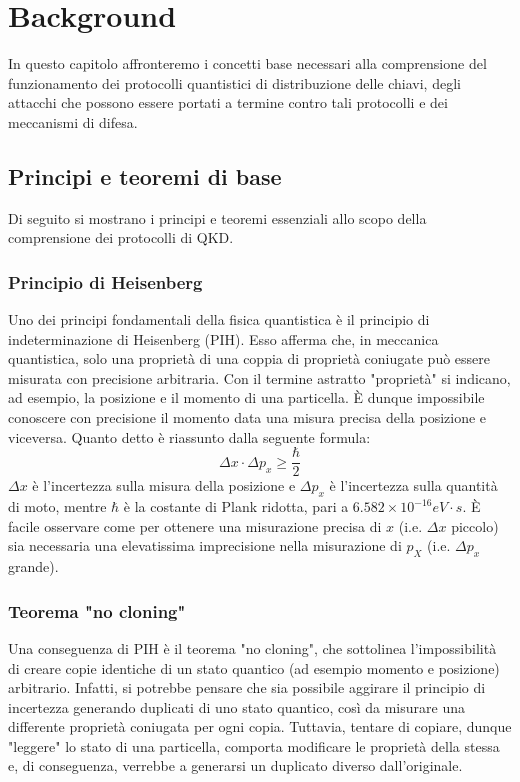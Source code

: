 \chapter{Background}
\label{chap:background}

In questo capitolo affronteremo i concetti base necessari alla comprensione del funzionamento dei protocolli quantistici di distribuzione delle chiavi, degli attacchi che possono essere portati a termine contro tali protocolli e dei meccanismi di difesa.

\section{Principi e teoremi di base}
\label{sec:principi_teoremi}
Di seguito si mostrano i principi e teoremi essenziali allo scopo della comprensione dei protocolli di QKD.

\subsection{Principio di Heisenberg}
Uno dei principi fondamentali della fisica quantistica è il principio di indeterminazione di Heisenberg (PIH). Esso afferma che, in meccanica quantistica, solo una proprietà di una coppia di proprietà coniugate può essere misurata con precisione arbitraria. Con il termine astratto "proprietà" si indicano, ad esempio, la posizione e il momento di una particella. È dunque impossibile conoscere con precisione il momento data una misura precisa della posizione e viceversa. Quanto detto è riassunto dalla seguente formula:
$$ \Delta x \cdot \Delta p_x \geq \frac{\hbar}{2} $$
$\Delta x$ è l'incertezza sulla misura della posizione e $\Delta p_x$ è l'incertezza sulla quantità di moto, mentre $\hbar$  è la costante di Plank ridotta, pari a $6.582 \times 10^{-16} eV \cdot s$. È facile osservare come per ottenere una misurazione precisa di $x$ (i.e. $\Delta x$ piccolo) sia necessaria una elevatissima imprecisione nella misurazione di $p_X$ (i.e. $\Delta p_x$ grande).

\subsection{Teorema "no cloning"}
Una conseguenza di PIH è il teorema "no cloning", che sottolinea l'impossibilità di creare copie identiche di un stato quantico (ad esempio momento e posizione) arbitrario. Infatti, si potrebbe pensare che sia possibile aggirare il principio di incertezza generando duplicati di uno stato quantico, così da misurare una differente proprietà coniugata per ogni copia. Tuttavia, tentare di copiare, dunque "leggere" lo stato di una particella, comporta modificare le proprietà della stessa e, di conseguenza, verrebbe a generarsi un duplicato diverso dall'originale. 

